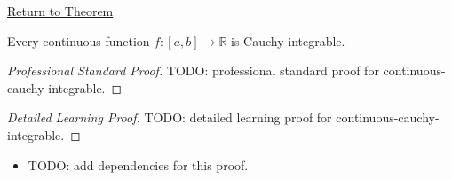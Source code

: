 \newpage
{}
\label{prf:continuous-cauchy-integrable}
\begin{remark*}[Return]\hyperref[thm:continuous-cauchy-integrable]{Return to Theorem}\end{remark*}

\begin{theorem*}
Every continuous function \(f:[a,b]\to\mathbb{R}\) is Cauchy-integrable.
\end{theorem*}

\begin{proof}[Professional Standard Proof]
\LRAProofBodyStart
TODO: professional standard proof for continuous-cauchy-integrable.
\end{proof}

\begin{proof}[Detailed Learning Proof]
\LRAProofBodyStart
TODO: detailed learning proof for continuous-cauchy-integrable.
\end{proof}

\begin{remark*}
\end{remark*}

\begin{dependencies}
\begin{itemize}
  \item TODO: add dependencies for this proof.
\end{itemize}
\end{dependencies}

\clearpage
